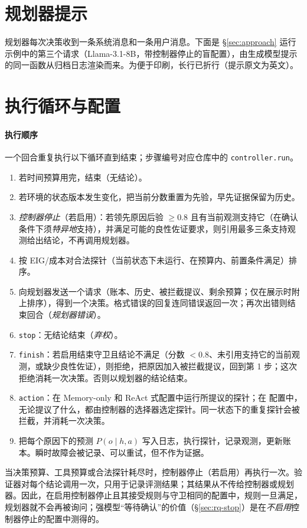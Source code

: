\section{规划器提示}
\label{app:prompt}

规划器每次决策收到一条系统消息和一条用户消息。下面是 \S\ref{sec:approach} 运行示例中的第三个请求（Llama-3.1-8B，带控制器停止的盲配置），由生成模型提示的同一函数从归档日志渲染而来。为便于印刷，长行已折行（提示原文为英文）。



\section{执行循环与配置}
\label{app:loop}

\paragraph{执行顺序} 一个回合重复执行以下循环直到结束；步骤编号对应仓库中的 \texttt{controller.run}。
\begin{enumerate}\setlength\itemsep{0pt}
  \item 若时间预算用完，结束（无结论）。
  \item 若环境的状态版本发生变化，把当前分数重置为先验，早先证据保留为历史。
  \item \emph{控制器停止}（若启用）：若领先原因后验 $\ge 0.8$ 且有当前观测支持它（在确认条件下须\emph{特异地}支持），并满足可能的良性佐证要求，则引用最多三条支持观测给出结论，不再调用规划器。
  \item 按 EIG/成本对合法探针（当前状态下未运行、在预算内、前置条件满足）排序。
  \item 向规划器发送一个请求（账本、历史、被拦截提议、剩余预算；仅在展示时附上排序），得到一个决策。格式错误的回复连同错误返回一次；再次出错则结束回合（\emph{规划器错误}）。
  \item \texttt{stop}：无结论结束（\emph{弃权}）。
  \item \texttt{finish}：若启用结束守卫且结论不满足（分数 $< 0.8$、未引用支持它的当前观测，或缺少良性佐证），则拒绝，把原因加入被拦截提议，回到第 1 步；这次拒绝消耗一次决策。否则以规划器的结论结束。
  \item \texttt{action}：在 Memory-only 和 ReAct 式配置中运行所提议的探针；在 \hesp{} 配置中，无论提议了什么，都由控制器的选择器选定探针。同一状态下的重复探针会被拦截，并消耗一次决策。
  \item 把每个原因下的预测 $P(o \mid h, a)$ 写入日志，执行探针，记录观测，更新账本。瞬时故障会被记录、可以重试，但不作为证据。
\end{enumerate}
当决策预算、工具预算或合法探针耗尽时，控制器停止（若启用）再执行一次。验证器对每个结论调用一次，只用于记录评测结果；其结果从不传给控制器或规划器。因此，在启用控制器停止且其接受规则与守卫相同的配置中，规则一旦满足，规划器就不会再被询问；强模型“等待确认”的价值（\S\ref{sec:rq-stop}）是在\emph{不启用}控制器停止的配置中测得的。


